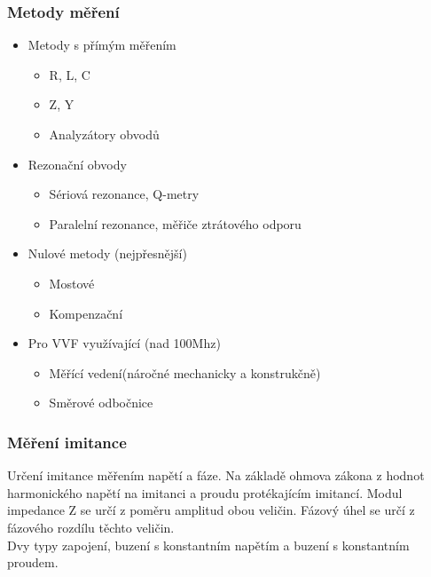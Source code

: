 \subsubsection{Metody měření}
\begin{itemize}
    \item Metody s přímým měřením
          \begin{itemize}
              \item R, L, C
              \item Z, Y
              \item Analyzátory obvodů
          \end{itemize}
    \item Rezonační obvody
          \begin{itemize}
              \item Sériová rezonance, Q-metry
              \item Paralelní rezonance, měřiče ztrátového odporu
          \end{itemize}
    \item Nulové metody (nejpřesnější)
          \begin{itemize}
              \item Mostové
              \item Kompenzační
          \end{itemize}
    \item Pro VVF využívající (nad 100Mhz)
          \begin{itemize}
              \item Měřící vedení(náročné mechanicky a konstrukčně)
              \item Směrové odbočnice
          \end{itemize}
\end{itemize}

\subsubsection{Měření imitance}
Určení imitance měřením napětí a fáze. Na základě ohmova zákona z hodnot harmonického napětí na imitanci a proudu protékajícím imitancí. Modul impedance Z se určí z poměru amplitud obou veličin. Fázový úhel se určí z fázového rozdílu těchto veličin.\\
Dvy typy zapojení, buzení s konstantním napětím a buzení s konstantním proudem.\\

